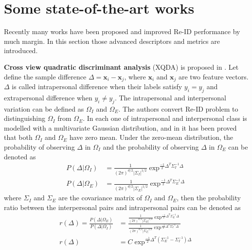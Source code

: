 %

\section{Some state-of-the-art works}
Recently many works have been proposed and improved Re-ID performance by much margin. In this section those advanced descriptors and metrics are introduced. 

\textbf{Cross view quadratic discriminant analysis} (XQDA) is proposed in \cite{LOMO}. Let define the sample difference $\Delta = \bm{x}_i - \bm{x}_j$, where $\bm{x}_i $ and $\bm{x}_j$ are two feature vectors. $\Delta$ is called intrapersonal difference when their labels satisfy $y_i = y_j$ and extrapersonal difference when $y_i \ne y_j$. The intrapersonal and interpersonal variation can be defined as $\Omega_I$ and $\Omega_E$. The authors convert Re-ID problem to distinguishing $\Omega_I$ from $\Omega_E$. In \cite{Bayeface}  each one of intrapersonal and interpersonal class is modelled with a multivariate Gaussian distribution, and in \cite{Bayeface} it has been proved that both $\Omega_I$ and $\Omega_E$ have zero mean. Under the zero-mean distribution, the probability of observing $\Delta$ in $\Omega_I$ and the probability of observing $\Delta$ in $\Omega_E$ can be denoted as
\begin{equation}
\begin{aligned}
P(\Delta|\Omega_I) &= \frac{1}{(2\pi)^{d/2}|\Sigma_I|^{1/2}}\exp^{\frac{-1}{2}\Delta^T\Sigma_I^{-1}\Delta}\\
P(\Delta|\Omega_E) &= \frac{1}{(2\pi)^{d/2}|\Sigma_E|^{1/2}}\exp^{\frac{-1}{2}\Delta^T\Sigma_E^{-1}\Delta}
\end{aligned}
\end{equation}
where $\Sigma_I$ and $\Sigma_E$ are the covariance matrix of $\Omega_I$ and $\Omega_E$, then the probability ratio between the interpersonal pairs and intrapersonal pairs can be denoted as
\begin{equation}
\begin{aligned}
r(\Delta) = \frac{P(\Delta|\Omega_E)}{P(\Delta|\Omega_I)}
	   &=\frac{\frac{1}{(2\pi)^{d/2}|\Sigma_E|^{1/2}}\exp^{\frac{-1}{2}\Delta^T\Sigma_E^{-1}\Delta}}{\frac{1}{(2\pi)^{d/2}|\Sigma_I|^{1/2}}\exp^{\frac{-1}{2}\Delta^T\Sigma_I^{-1}\Delta}}\\
r(\Delta)& =  C\exp^{\frac{-1}{2}\Delta^T(\Sigma_E^{-1} - \Sigma_I^{-1})\Delta}
\end{aligned}
\end{equation}
